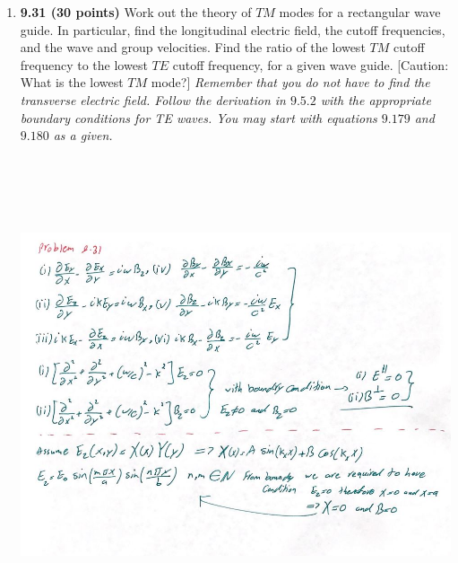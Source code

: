 \documentclass[fleqn]{article}
\begin{document}
\begin{enumerate}
    \item \textbf{9.31 (30 points)} Work out the theory of $TM$ modes for a rectangular wave guide. In particular, find the 
    longitudinal electric field, the cutoff frequencies, and the wave and group velocities. Find the ratio of the lowest 
    $TM$ cutoff frequency to the lowest $TE$ cutoff frequency, for a given wave guide. [Caution: What is the lowest $TM$ mode?]
    \emph{Remember that you do not have to find the transverse electric field.  Follow the derivation in $9.5.2$ with the 
    appropriate boundary conditions for TE waves.  You may start with equations $9.179$ and $9.180$ as a given.}

    \begin{center}
      \includegraphics[height=14cm, width=16cm]{4.JPG}
    \end{center}

    \pagebreak


\end{enumerate}
\end{document}
